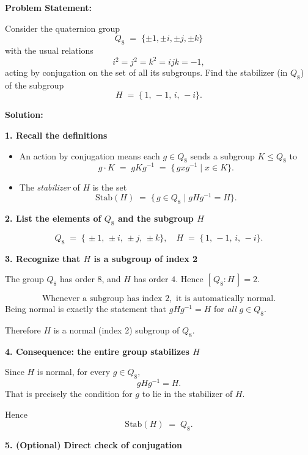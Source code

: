 \documentclass[12pt]{article}
\theoremstyle{definition} %
\theoremstyle{plain} %
\begin{document}
\noindent
\textbf{Problem Statement:} 

Consider the quaternion group 
\[
Q_8 \;=\;\{\pm 1,\pm i,\pm j,\pm k\}
\]
with the usual relations
\[
i^2 = j^2 = k^2 = ijk = -1,
\]
acting by conjugation on the set of all its subgroups. Find the stabilizer (in $Q_8$) of the subgroup 
\[
H \;=\;\{\,1,\,-1,\,i,\,-i\}.
\]

\bigskip

\noindent
\textbf{Solution:}

\bigskip

\noindent
\textbf{1. Recall the definitions}

\begin{itemize}
    \item An action by conjugation means each $g \in Q_8$ sends a subgroup $K \le Q_8$ to
    \[
    g \cdot K \;=\; gKg^{-1} \;=\; \{\, g x g^{-1} \mid x \in K \}.
    \]
    \item The \emph{stabilizer} of $H$ is the set
    \[
    \mathrm{Stab}(H) \;=\;\{\,g \in Q_8 \mid gHg^{-1} = H \}.
    \]
\end{itemize}

\bigskip

\noindent
\textbf{2. List the elements of $Q_8$ and the subgroup $H$}

\[
Q_8 \;=\; \{\, \pm 1,\, \pm i,\, \pm j,\, \pm k \},
\quad
H \;=\; \{\,1,\, -1,\, i,\, -i\}.
\]

\bigskip

\noindent
\textbf{3. Recognize that $H$ is a subgroup of index 2}

The group $Q_8$ has order $8$, and $H$ has order $4$. Hence $[\,Q_8 : H\,] = 2$. 

\[
\text{Whenever a subgroup has index }2,\text{ it is automatically normal.}
\]
Being normal is exactly the statement that $g H g^{-1} = H$ for \emph{all} $g\in Q_8.$ 

Therefore $H$ is a normal (index 2) subgroup of $Q_8$.

\bigskip

\noindent
\textbf{4. Consequence: the entire group stabilizes $H$}

Since $H$ is normal, for every $g \in Q_8,$
\[
g H g^{-1} = H.
\]
That is precisely the condition for $g$ to lie in the stabilizer of $H$.

Hence
\[
\mathrm{Stab}(H) \;=\; Q_8.
\]

\bigskip

\noindent
\textbf{5. (Optional) Direct check of conjugation}
\end{document}
